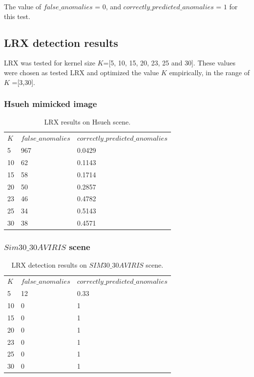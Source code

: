 The value of $false\_anomalies$ = 0, and  $correctly\_predicted\_anomalies$ = $1$ for this test.

\subsection{LRX detection results}
LRX was tested for kernel size $K$=[5, 10, 15, 20, 23, 25 and 30]. These values were chosen as  \cite{global_and_local_rx} tested LRX and optimized the value $K$ empirically, in the range of $K$ =[3,30]. 

\subsubsection{Hsueh mimicked image}

 \begin{table}[H]
\centering
 \resizebox{0.9\textwidth}{!}
{\begin{tabular}{l|l|l}
\textbf{$K$} & $false\_anomalies$ & $correctly\_predicted\_anomalies$\\
5 & 967 &0.0429 \\
10 & 62&0.1143 \\
15 & 58&0.1714 \\
20 & 50& 0.2857\\
23 &46 &0.4782 \\
25 &34 & 0.5143\\
30 & 38& 0.4571\\

\end{tabular}}
\caption{LRX results on Hsueh scene.}
\label{tab:LRX_Hsueh}
\end{table}



\subsubsection{$Sim30\_30 AVIRIS$ scene}
 \begin{table}[H]
\centering
 \resizebox{0.9\textwidth}{!}
{\begin{tabular}{l|l|l}
\textbf{$K$} & $false\_anomalies$ & $correctly\_predicted\_anomalies$\\
5 &12 &0.33 \\
10 &0 &1 \\
15 & 0&1 \\
20 & 0&1 \\
23 &0 &1 \\
25 &0 &1 \\
30 & 0&1 \\

\end{tabular}}
\caption{LRX detection results on $SIM30\_30AVIRIS$ scene.}
\label{tab:LRX}

\end{table}

